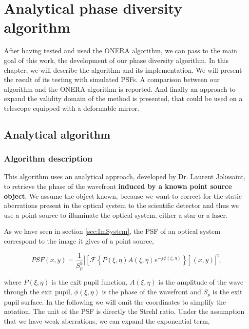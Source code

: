 \chapter{Analytical phase diversity algorithm} 
\label{ch:ourPD}

After having tested and used the ONERA algorithm, we can pass to the main goal of this work, the development of our phase diversity algorithm. In this chapter, we will describe the algorithm and its implementation. We will present the result of its testing with simulated PSFs. A comparison between our algorithm and the ONERA algorithm is reported. And finally an approach to expand the validity domain of the method is presented, that could be used on a telescope equipped with a deformable mirror.

\section{Analytical algorithm}
\label{sec:AnAlgo}

\subsection{Algorithm description}
\label{subsec:ANalgoDesc}

This algorithm uses an analytical approach, developed by Dr. Laurent Jolissaint, to retrieve the phase of the wavefront \textbf{induced by a known point source object}. We assume the object known, because we want to correct for the static aberrations present in the optical system to the scientific detector and thus we use a point source to illuminate the optical system, either a star or a laser.

As we have seen in section \ref{sec:ImSystem}, the PSF of an optical system correspond to the image it gives of a point source,

\begin{equation}
PSF(x,y) = \frac{1}{S_p^2}|\left[\mathcal{F}\left\lbrace P(\xi,\eta)A(\xi,\eta)e^{-j\phi(\xi,\eta)} \right\rbrace\right](x,y)|^2,
\label{eqt:PSF}
\end{equation}

where $P(\xi,\eta)$ is the exit pupil function, $A(\xi,\eta)$ is the amplitude of the wave through the exit pupil, $\phi(\xi,\eta)$ is the phase of the wavefront and $S_p$ is the exit pupil surface. In the following we will omit the coordinates to simplify the notation. The unit of the PSF is directly the Strehl ratio. Under the assumption that we have weak aberrations, we can expand the exponential term,

